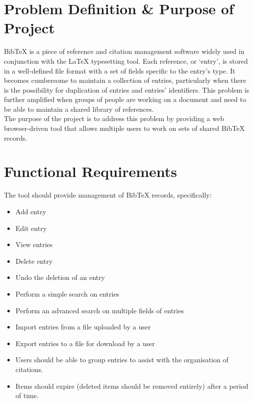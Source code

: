 \documentclass{l3proj}
\begin{document}
\section*{Problem Definition \& Purpose of Project}
BibTeX is a piece of reference and citation management software widely used in conjunction with the LaTeX typesetting tool.  Each reference, or `entry', is stored in a well-defined file format with a set of fields specific to the entry's type. It becomes cumbersome to maintain a collection of entries, particularly when there is the possibility for duplication of entries and entries' identifiers.  This problem is further amplified when groups of people are working on a document and need to be able to maintain a shared library of references.\\
The purpose of the project is to address this problem by providing a web browser-driven tool that allows multiple users to work on sets of shared BibTeX records.

\section*{Functional Requirements}
The tool should provide management of BibTeX records, specifically:
\begin{itemize}
\item Add entry
\item Edit entry
\item View entries
\item Delete entry
\item Undo the deletion of an entry
\item Perform a simple search on entries
\item Perform an advanced search on multiple fields of entries
\item Import entries from a file uploaded by a user
\item Export entries to a file for download by a user
\item Users should be able to group entries to assist with the organisation of citations.
\item Items should expire (deleted items should be removed entirely) after a period of time.
\end{itemize}
\end{document}
